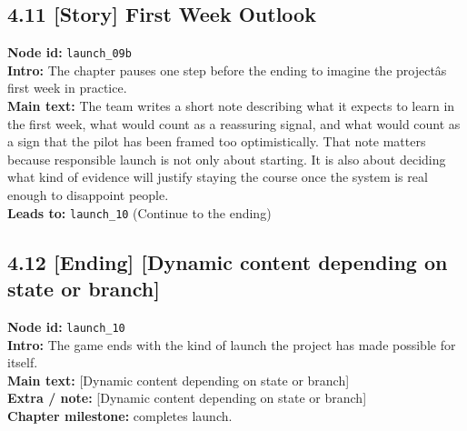 \documentclass[11pt]{article}
\begin{document}
\subsection*{4.11 [Story] First Week Outlook}
\textbf{Node id:} \texttt{launch\_09b}\\
\textbf{Intro:} The chapter pauses one step before the ending to imagine the projectâs first week in practice.\\
\textbf{Main text:} The team writes a short note describing what it expects to learn in the first week, what would count as a reassuring signal, and what would count as a sign that the pilot has been framed too optimistically. That note matters because responsible launch is not only about starting. It is also about deciding what kind of evidence will justify staying the course once the system is real enough to disappoint people.\\
\textbf{Leads to:} \texttt{launch\_10} (Continue to the ending)\\
\subsection*{4.12 [Ending] [Dynamic content depending on state or branch]}
\textbf{Node id:} \texttt{launch\_10}\\
\textbf{Intro:} The game ends with the kind of launch the project has made possible for itself.\\
\textbf{Main text:} [Dynamic content depending on state or branch]\\
\textbf{Extra / note:} [Dynamic content depending on state or branch]\\
\textbf{Chapter milestone:} completes launch.\\
\end{document}
